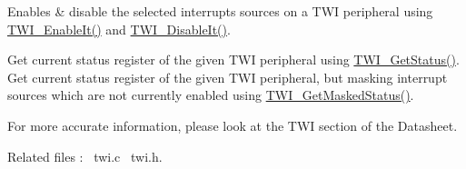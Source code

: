 \begin{DoxyItemize}
\item Enables \& disable the selected interrupts sources on a T\+WI peripheral using \mbox{\hyperlink{arm_2atsam_2contrib_2libraries_2libchip_2source_2twi_8c_ab3bf1b5df694229af5fae34ca569ab7b}{T\+W\+I\+\_\+\+Enable\+It()}} and \mbox{\hyperlink{arm_2atsam_2contrib_2libraries_2libchip_2source_2twi_8c_ac976e61b9b9d4488753f960d3df80c63}{T\+W\+I\+\_\+\+Disable\+It()}}. 
\item Get current status register of the given T\+WI peripheral using \mbox{\hyperlink{arm_2atsam_2contrib_2libraries_2libchip_2source_2twi_8c_a316b5d5ffbfa49a8d6517a061b92a4a6}{T\+W\+I\+\_\+\+Get\+Status()}}. Get current status register of the given T\+WI peripheral, but masking interrupt sources which are not currently enabled using \mbox{\hyperlink{arm_2atsam_2contrib_2libraries_2libchip_2source_2twi_8c_aee8c3520f24c54aedbad6cee6ab2eeaa}{T\+W\+I\+\_\+\+Get\+Masked\+Status()}}. 
\end{DoxyItemize}For more accurate information, please look at the T\+WI section of the Datasheet.

Related files \+:~\newline
twi.\+c~\newline
 twi.\+h.~\newline
 